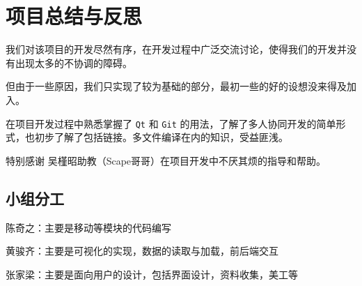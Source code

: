 \documentclass[UTF8,11pt]{ctexart}
\begin{document}
    \section{项目总结与反思}

    我们对该项目的开发尽然有序，在开发过程中广泛交流讨论，使得我们的开发并没有出现太多的不协调的障碍。

    但由于一些原因，我们只实现了较为基础的部分，最初一些的好的设想没来得及加入。

    在项目开发过程中熟悉掌握了 \verb|Qt| 和 \verb|Git| 的用法，了解了多人协同开发的简单形式，也初步了解了包括链接。多文件编译在内的知识，受益匪浅。

    特别感谢 吴槿昭助教（Scape哥哥）在项目开发中不厌其烦的指导和帮助。


    \subsection{小组分工}
    
    陈奇之：主要是移动等模块的代码编写

    黄骏齐：主要是可视化的实现，数据的读取与加载，前后端交互

    张家梁：主要是面向用户的设计，包括界面设计，资料收集，美工等
\end{document}
